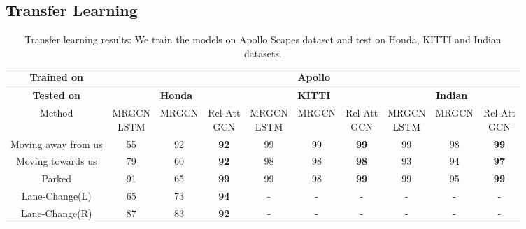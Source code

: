 \documentclass[letterpaper, 10 pt, conference]{ieeeconf}
\begin{document}
\subsection{Transfer Learning}
\begin{table*}[!ht]
\renewcommand{\arraystretch}{1.3}

    \centering
\vspace{2mm}
    \begin{tabular}{|c||c|c|c||c|c|c||c|c|c|}
    \hline
    \textbf{Trained on} & \multicolumn{9}{|c|}{\textbf{Apollo}} \\
    \hline
    \textbf{Tested on} & \multicolumn{3}{|c||}{\textbf{Honda}} & \multicolumn{3}{|c||}{\textbf{KITTI}} & \multicolumn{3}{|c|}{\textbf{Indian}}  \\
    \hline
    Method  & \shortstack{MRGCN\\LSTM} & MRGCN & \shortstack{Rel-Att\\GCN} & \shortstack{MRGCN\\LSTM} & MRGCN & \shortstack{Rel-Att\\GCN} & \shortstack{MRGCN\\LSTM} & MRGCN & \shortstack{Rel-Att\\GCN}   \\
\hline

    Moving away from us     & 55 & 92 & \textbf{92}   & 99 & 99 & \textbf{99}  & 99 & 98 & \textbf{99}  \\
    Moving towards us       & 79 & 60 & \textbf{92}   & 98 & 98 & \textbf{98}  & 93 & 94 & \textbf{97} \\
    Parked                  & 91 & 65 & \textbf{99}   & 99 & 98 & \textbf{99}  & 99 & 95 & \textbf{99} \\
    Lane-Change(L)          & 65 & 73 & \textbf{94}   & - & - & - & - & - & - \\
    Lane-Change(R)          & 87 & 83 & \textbf{92}   & - & - & - & - & - & - \\
    


    \hline
    \end{tabular}
\caption{\scriptsize Transfer learning results: We train the models on Apollo Scapes dataset and test on Honda, KITTI and Indian datasets. 
}
\label{table:transfer_complete}
\end{table*}
\end{document}
